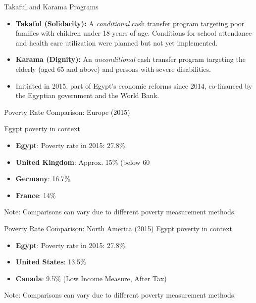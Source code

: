 \documentclass{beamer}
\begin{document}
\begin{frame}{Takaful and Karama Programs}
\begin{itemize}
    \item \textbf{Takaful (Solidarity):} A \textit{conditional} cash transfer program targeting poor families with children under 18 years of age. Conditions for school attendance and health care utilization were planned but not yet implemented.
    \item \textbf{Karama (Dignity):} An \textit{unconditional} cash transfer program targeting the elderly (aged 65 and above) and persons with severe disabilities.
\item Initiated in 2015, part of Egypt's economic reforms since 2014, co-financed by the Egyptian government and the World Bank.
\end{itemize}
\end{frame}

\begin{frame}{Poverty Rate Comparison: Europe (2015)}

Egypt poverty in context

\begin{itemize}
    \item \textbf{Egypt}: Poverty rate in 2015: 27.8\%.
    \item \textbf{United Kingdom}: Approx. 15\% (below 60%
    \item \textbf{Germany}: 16.7\%
    \item \textbf{France}: 14\%
\end{itemize}
\small Note: Comparisons can vary due to different poverty measurement methods.
\end{frame}

\begin{frame}{Poverty Rate Comparison: North America (2015)}
Egypt poverty in context

\begin{itemize}
    \item \textbf{Egypt}: Poverty rate in 2015: 27.8\%.
    \item \textbf{United States}: 13.5\%
    \item \textbf{Canada}: 9.5\% (Low Income Measure, After Tax)
\end{itemize}
\small Note: Comparisons can vary due to different poverty measurement methods.
\end{frame}
\end{document}
